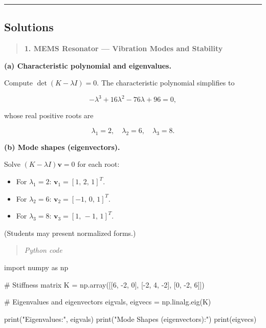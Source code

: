 \documentclass[
  letterpaper,
  DIV=11,
  numbers=noendperiod]{scrreprt}
\newenvironment{Shaded}{\begin{snugshade}}{\end{snugshade}}
\newcommand{\BuiltInTok}[1]{\textcolor[rgb]{0.00,0.23,0.31}{#1}}
\newcommand{\CommentTok}[1]{\textcolor[rgb]{0.37,0.37,0.37}{#1}}
\newcommand{\DecValTok}[1]{\textcolor[rgb]{0.68,0.00,0.00}{#1}}
\newcommand{\ImportTok}[1]{\textcolor[rgb]{0.00,0.46,0.62}{#1}}
\newcommand{\NormalTok}[1]{\textcolor[rgb]{0.00,0.23,0.31}{#1}}
\newcommand{\OperatorTok}[1]{\textcolor[rgb]{0.37,0.37,0.37}{#1}}
\newcommand{\StringTok}[1]{\textcolor[rgb]{0.13,0.47,0.30}{#1}}
\providecommand{\tightlist}{%
  \setlength{\itemsep}{0pt}\setlength{\parskip}{0pt}}
\begin{document}
\begin{center}\rule{0.5\linewidth}{0.5pt}\end{center}

\subsection{Solutions}\label{solutions}

\begin{quote}
\textbf{1. MEMS Resonator --- Vibration Modes and Stability}
\end{quote}

\textbf{(a) Characteristic polynomial and eigenvalues.}

Compute \(\det(K-\lambda I)=0\). The characteristic polynomial
simplifies to

\[-\lambda^3 +16\lambda^2 -76\lambda +96 = 0,\]

whose real positive roots are

\[\lambda_1 = 2,\quad \lambda_2 = 6,\quad \lambda_3 = 8.\]

\textbf{(b) Mode shapes (eigenvectors).}

Solve \((K-\lambda I)\mathbf v=0\) for each root:

\begin{itemize}
\tightlist
\item
  For \(\lambda_1=2\): \(\mathbf v_1 = [1,\,2,\,1]^T\).
\item
  For \(\lambda_2=6\): \(\mathbf v_2 = [-1,\,0,\,1]^T\).
\item
  For \(\lambda_3=8\): \(\mathbf v_3 = [1,\,-1,\,1]^T\).
\end{itemize}

(Students may present normalized forms.)

\begin{quote}
\emph{Python code}
\end{quote}

\begin{Shaded}
\begin{Highlighting}[]
\ImportTok{import}\NormalTok{ numpy }\ImportTok{as}\NormalTok{ np}

\CommentTok{\# Stiffness matrix}
\NormalTok{K }\OperatorTok{=}\NormalTok{ np.array([[}\DecValTok{6}\NormalTok{, }\OperatorTok{{-}}\DecValTok{2}\NormalTok{, }\DecValTok{0}\NormalTok{],}
\NormalTok{              [}\OperatorTok{{-}}\DecValTok{2}\NormalTok{, }\DecValTok{4}\NormalTok{, }\OperatorTok{{-}}\DecValTok{2}\NormalTok{],}
\NormalTok{              [}\DecValTok{0}\NormalTok{, }\OperatorTok{{-}}\DecValTok{2}\NormalTok{, }\DecValTok{6}\NormalTok{]])}

\CommentTok{\# Eigenvalues and eigenvectors}
\NormalTok{eigvals, eigvecs }\OperatorTok{=}\NormalTok{ np.linalg.eig(K)}

\BuiltInTok{print}\NormalTok{(}\StringTok{"Eigenvalues:"}\NormalTok{, eigvals)}
\BuiltInTok{print}\NormalTok{(}\StringTok{"Mode Shapes (eigenvectors):"}\NormalTok{)}
\BuiltInTok{print}\NormalTok{(eigvecs)}
\end{Highlighting}
\end{Shaded}
\end{document}
